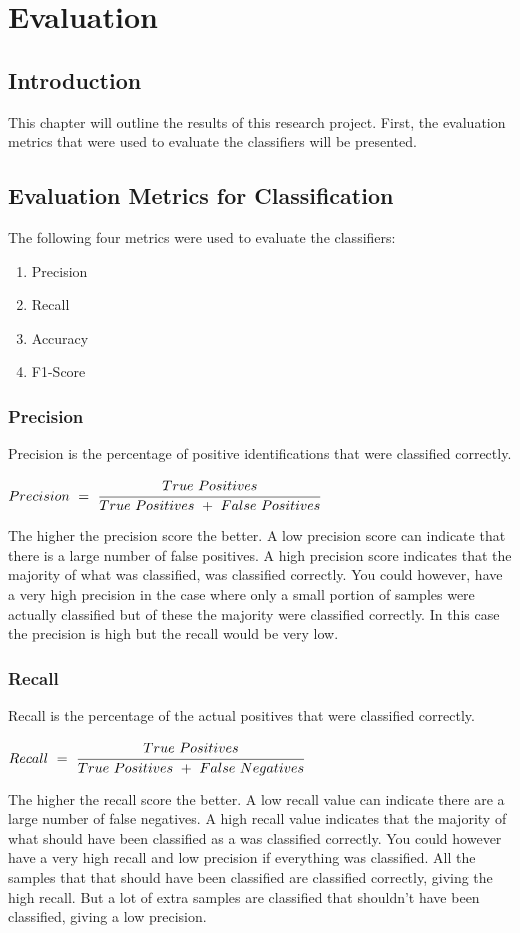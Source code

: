 \chapter{Evaluation}

\section{Introduction}
This chapter will outline the results of this research project. First, the evaluation metrics that were used to evaluate the classifiers will be presented.

\section{Evaluation Metrics for Classification}
The following four metrics were used to evaluate the classifiers:
\begin{enumerate}
    \item Precision
    \item Recall
    \item Accuracy
    \item F1-Score
\end{enumerate}

\subsection*{Precision}
Precision is the percentage of positive identifications that were classified correctly.
\begin{center}
    $Precision\ =\ \cfrac{True\ Positives}{True\ Positives\ +\ False\ Positives}$
\end{center}
The higher the precision score the better. A low precision score can indicate that there is a large number of false positives. A high precision score indicates that the majority of what was classified, was classified correctly. You could however, have a very high precision in the case where only a small portion of samples were actually classified but of these the majority were classified correctly. In this case the precision is high but the recall would be very low.

\subsection*{Recall}
Recall is the percentage of the actual positives that were classified correctly.
\begin{center}
    $Recall\ =\ \cfrac{True\ Positives}{True\ Positives\ +\ False\ Negatives}$
\end{center}
The higher the recall score the better. A low recall value can indicate there are a large number of false negatives. A high recall value indicates that the majority of what should have been classified as a was classified correctly. You could however have a very high recall and low precision if everything was classified. All the samples that that should have been classified are classified correctly, giving the high recall. But a lot of extra samples are classified that shouldn't have been classified, giving a low precision.


